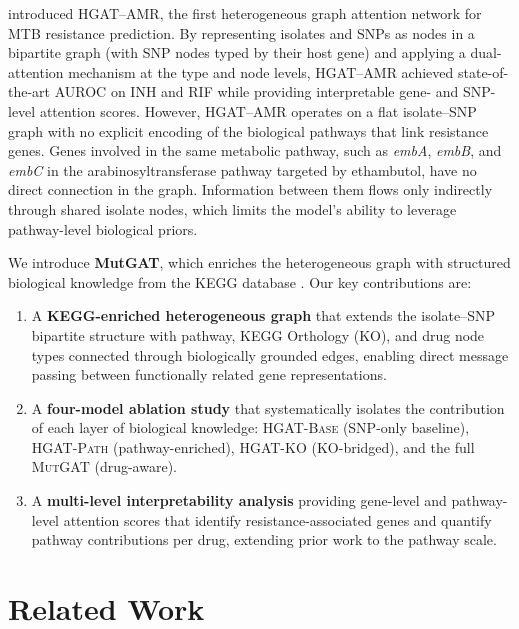 \documentclass{article}
\theoremstyle{plain}
\theoremstyle{definition}
\theoremstyle{remark}
\begin{document}
\citet{yang2021hgat} introduced HGAT--AMR, the first heterogeneous graph attention network for MTB resistance prediction. By representing isolates and SNPs as nodes in a bipartite graph (with SNP nodes typed by their host gene) and applying a dual-attention mechanism at the type and node levels, HGAT--AMR achieved state-of-the-art AUROC on INH and RIF while providing interpretable gene- and SNP-level attention scores. However, HGAT--AMR operates on a flat isolate--SNP graph with no explicit encoding of the biological pathways that link resistance genes. Genes involved in the same metabolic pathway, such as \textit{embA}, \textit{embB}, and \textit{embC} in the arabinosyltransferase pathway targeted by ethambutol, have no direct connection in the graph. Information between them flows only indirectly through shared isolate nodes, which limits the model's ability to leverage pathway-level biological priors.

We introduce \textbf{MutGAT}, which enriches the heterogeneous graph with structured biological knowledge from the KEGG database \citep{kanehisa2000kegg}. Our key contributions are:
\begin{enumerate}
    \item A \textbf{KEGG-enriched heterogeneous graph} that extends the isolate--SNP bipartite structure with pathway, KEGG Orthology (KO), and drug node types connected through biologically grounded edges, enabling direct message passing between functionally related gene representations.
    \item A \textbf{four-model ablation study} that systematically isolates the contribution of each layer of biological knowledge: \textsc{HGAT-Base} (SNP-only baseline), \textsc{HGAT-Path} (pathway-enriched), \textsc{HGAT-KO} (KO-bridged), and the full \textsc{MutGAT} (drug-aware).
    \item A \textbf{multi-level interpretability analysis} providing gene-level and pathway-level attention scores that identify resistance-associated genes and quantify pathway contributions per drug, extending prior work to the pathway scale.
\end{enumerate}


\section{Related Work}
\label{sec:related}
\end{document}
